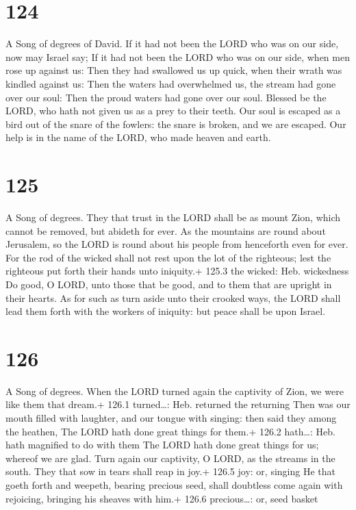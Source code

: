 \hypertarget{section-124}{%
\section{124}\label{section-124}}

A Song of degrees of David.  If it had not been the LORD who
was on our side, now may Israel say;  If it had not been the
LORD who was on our side, when men rose up against us:  Then
they had swallowed us up quick, when their wrath was kindled against us:
 Then the waters had overwhelmed us, the stream had gone
over our soul:  Then the proud waters had gone over our
soul.  Blessed be the LORD, who hath not given us as a prey
to their teeth.  Our soul is escaped as a bird out of the
snare of the fowlers: the snare is broken, and we are escaped.
 Our help is in the name of the LORD, who made heaven and
earth.

\hypertarget{section-125}{%
\section{125}\label{section-125}}

A Song of degrees.  They that trust in the LORD shall be as
mount Zion, which cannot be removed, but abideth for ever. 
As the mountains are round about Jerusalem, so the LORD is round about
his people from henceforth even for ever.  For the rod of
the wicked shall not rest upon the lot of the righteous; lest the
righteous put forth their hands unto iniquity.+ 125.3 the wicked: Heb.
wickedness  Do good, O LORD, unto those that be good, and to
them that are upright in their hearts.  As for such as turn
aside unto their crooked ways, the LORD shall lead them forth with the
workers of iniquity: but peace shall be upon Israel.

\hypertarget{section-126}{%
\section{126}\label{section-126}}

A Song of degrees.  When the LORD turned again the captivity
of Zion, we were like them that dream.+ 126.1 turned\ldots: Heb.
returned the returning  Then was our mouth filled with
laughter, and our tongue with singing: then said they among the heathen,
The LORD hath done great things for them.+ 126.2 hath\ldots: Heb. hath
magnified to do with them  The LORD hath done great things
for us; whereof we are glad.  Turn again our captivity, O
LORD, as the streams in the south.  They that sow in tears
shall reap in joy.+ 126.5 joy: or, singing  He that goeth
forth and weepeth, bearing precious seed, shall doubtless come again
with rejoicing, bringing his sheaves with him.+ 126.6 precious\ldots:
or, seed basket

